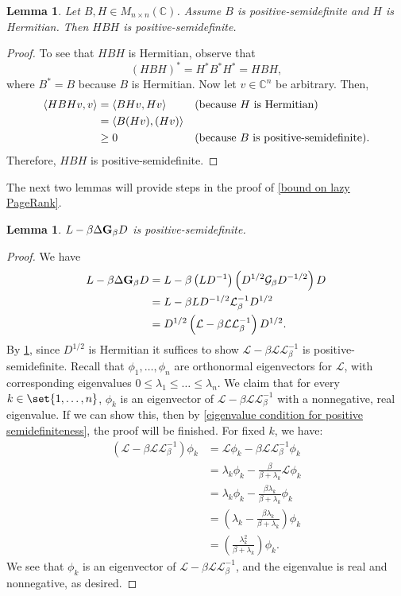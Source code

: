 \documentclass[12pt]{article}
\newtheorem{lem}[thm]{Lemma}
\theoremstyle{definition}
\newcommand{\C}{\mathbb C}
\newcommand{\lap}{\mathcal{L}}
\newcommand{\laplace}{\Delta}
\newcommand{\green}{\mathcal{G}}
\newcommand{\asymgreen}{\normalfont{\textbf{G}}}
\DeclarePairedDelimiter\inner{\langle}{\rangle}
\begin{document}
\begin{lem}\label{HBH positive semidefinite}
Let $B, H \in M_{n \times n}(\C)$. Assume $B$ is positive-semidefinite and $H$ is Hermitian. Then $HBH$ is positive-semidefinite.
\end{lem}
\begin{proof}
To see that $HBH$ is Hermitian, observe that
$$
(HBH)^* = H^* B^* H^* = HBH,
$$
where $B^* = B$ because $B$ is Hermitian. Now let $v \in \C^n$ be arbitrary. Then,
\begin{align*}
\inner*{HBH v, v}
&= \inner*{B H v, H v} &&\text{(because $H$ is Hermitian)} \\
&= \inner*{B (H v), (H v)} \\
&\geq 0 &&\text{(because $B$ is positive-semidefinite)}.
\end{align*}
Therefore, $HBH$ is positive-semidefinite.
\end{proof}

The next two lemmas will provide steps in the proof of \cref{bound on lazy PageRank}.

\begin{lem}\label{Laplacian expression is positive semidefinite}
$L - \beta \laplace \asymgreen_\beta D$ is positive-semidefinite.
\end{lem}
\begin{proof}
We have 
\begin{align*}
L - \beta \laplace \asymgreen_\beta D
&= L - \beta \left( L D^{-1} \right) \left( D^{1/2} \green_\beta D^{-1/2} \right) D \\
&= L - \beta L D^{-1/2} \lap_\beta^{-1} D^{1/2} \\
&= D^{1/2} \left( \lap - \beta \lap \lap_\beta^{-1} \right) D^{1/2}.
\end{align*}
By \cref{HBH positive semidefinite}, since $D^{1/2}$ is Hermitian it suffices to show $\lap - \beta \lap \lap_\beta^{-1}$ is positive-semidefinite. Recall that $\phi_1, \dots, \phi_n$ are orthonormal eigenvectors for $\lap$, with corresponding eigenvalues $0 \leq \lambda_1 \leq \dots \leq \lambda_n.$ We claim that for every $k \in \set{1, \dots, n}$, $\phi_k$ is an eigenvector of $\lap - \beta \lap \lap_\beta^{-1}$ with a nonnegative, real eigenvalue. If we can show this, then by \cref{eigenvalue condition for positive semidefiniteness}, the proof will be finished. For fixed $k$, we have:
\begin{align*}
\left( \lap - \beta \lap \lap_\beta^{-1} \right) \phi_k 
&= \lap \phi_k - \beta \lap \lap_\beta^{-1} \phi_k \\
&= \lambda_k \phi_k - \frac{\beta}{\beta + \lambda_k} \lap \phi_k \\
&= \lambda_k \phi_k - \frac{\beta \lambda_k}{\beta + \lambda_k} \phi_k \\
&= \left(\lambda_k - \frac{\beta \lambda_k}{\beta + \lambda_k}  \right) \phi_k \\
&= \left( \frac{\lambda_k^2}{\beta + \lambda_k} \right) \phi_k.
\end{align*}
We see that $\phi_k$ is an eigenvector of $\lap - \beta \lap \lap_\beta^{-1}$, and the eigenvalue is real and nonnegative, as desired.
\end{proof}
\end{document}
